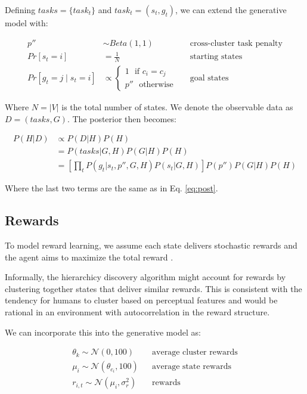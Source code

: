 \documentclass[11pt]{article}
\begin{document}
Defining $tasks = \{task_t\}$ and $task_t = (s_t,g_t)$, we can extend the generative model with:

\begin{align*}
    p'' &\sim Beta(1,1)		&& \text{cross-cluster task penalty} \\
    Pr[s_t = i] &= \frac{1}{N}		&& \text{starting states} \\
    Pr[g_t = j \mid s_t = i] &\propto \begin{cases} 1 \,\,\text{ if } c_i = c_j  \\ p'' \,\,\text{ otherwise} \end{cases} 		&& \text{goal states} 
\end{align*}

Where $N = |V|$ is the total number of states. We denote the observable data as $D = (tasks, G)$. The posterior then becomes:

\begin{align}
    P(H|D) &\propto P(D|H) P(H) \\ 
    &= P(tasks|G,H) P(G|H) P(H) \\
    &= \left[ \prod_t P(g_t|s_t,p'',G,H) P(s_t|G,H) \right] P(p'') P(G|H) P(H)
\end{align}

Where the last two terms are the same as in Eq. \ref{eq:post}.

\subsection{Rewards}

To model reward learning, we assume each state delivers stochastic rewards and the agent aims to maximize the total reward \cite{sutton2018reinforcement}. 

Informally, the hierarchicy discovery algorithm might account for rewards by clustering together states that deliver similar rewards. This is consistent with the tendency for humans to cluster based on perceptual features \cite{balaguer2016neural} and would be rational in an environment with autocorrelation in the reward structure.

We can incorporate this into the generative model as:

\begin{align*}
    \theta_k \sim \mathcal{N}(0, 100)  && \text{average cluster rewards} \\
    \mu_i \sim \mathcal{N}(\theta_{c_i}, 100)  && \text{average state rewards} \\
    r_{i,t} \sim \mathcal{N}(\mu_i, \sigma_r^2)  && \text{rewards}
\end{align*}
\end{document}
